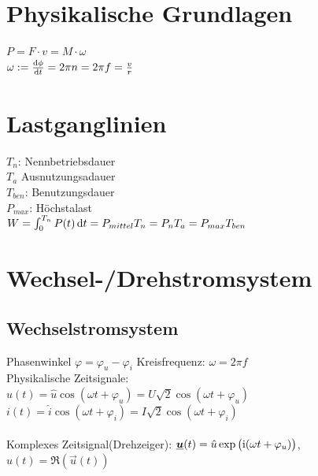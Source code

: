 \documentclass[fs, footer]{latex4ei}
\begin{document}
\begin{multicols}{4}



	\section{Physikalische Grundlagen}
	$P = F \cdot v = M \cdot \omega$ \\
	$\omega := \frac{\diff \phi}{\diff t} = 2 \pi n = 2 \pi f = \frac{v}{r}$ \\


	\section{Lastganglinien}
	$T_n$: Nennbetriebsdauer\\
	$T_a$ Ausnutzungsadauer\\
	$T_{ben}$: Benutzungsdauer\\
	$P_{max}$: Höchstalast\\
	$W = \int_0^{T_n} P(t) \diff t = P_{mittel} T_n = P_n T_a = P_{max} T_{ben}$\\
	
	\section{Wechsel-/Drehstromsystem}


		\subsection{Wechselstromsystem}
		Phasenwinkel $\varphi = \varphi_u - \varphi_i$ \qquad Kreisfrequenz: $\omega = 2\pi f$\\
		
		
		Physikalische Zeitsignale:\\
		$u(t) = \hat u \cos(\omega t + \varphi_u) = U \sqrt{2} \cos(\omega t + \varphi_u)$\\
		$i(t) = \hat i \cos(\omega t + \varphi_i) = I \sqrt{2} \cos(\omega t + \varphi_i)$\\
		\\
		Komplexes Zeitsignal(Drehzeiger): $\underline{\boldsymbol {u}}(t) = \hat u \exp\big(\mathrm{i} (\omega t + \varphi_u)\big)$, 
		$u(t) = \Re(\vec u(t))$\\
		

\end{multicols}
\end{document}
